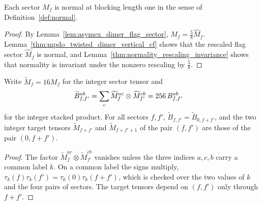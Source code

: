 \begin{lemma}
    \label{thm:asymex_dimer_normal}
    \leanok
    Each sector $M_f$ is normal at blocking length one in the sense of
    Definition~\ref{def:normal}.
\end{lemma}
\begin{proof}
    \leanok
    By Lemma~\ref{lem:asymex_dimer_flag_sector}, $M_f=\frac58\widehat M_f$.
    Lemma~\ref{thm:mpdo_twisted_dimer_vertical_cf} shows that the rescaled
    flag sector $\widehat M_f$ is normal, and
    Lemma~\ref{thm:normality_rescaling_invariance} shows that normality is
    invariant under the nonzero rescaling by $\frac58$.
\end{proof}

\begin{lemma}
    \label{lem:asymex_dimer_sign_rule}
    \leanok
    Write $\widetilde M_f=16M_f$ for the integer sector tensor and
    \begin{align}
        \widetilde B_{f,f'}^{ab}
         & =\sum_c\widetilde M_f^{ac}\otimes\widetilde M_{f'}^{cb}
        =256\,B_{f,f'}^{ab}
        \notag
    \end{align}
    for the integer stacked product. For all sectors $f,f'$,
    $\widetilde B_{f,f'}=\widetilde B_{0,f+f'}$, and the two integer target
    tensors $\widetilde M_{f+f'}$ and $\widetilde M_{f+f'+1}$ of the pair
    $(f,f')$ are those of the pair $(0,f+f')$.
\end{lemma}
\begin{proof}
    \leanok
    The factor $\widetilde M_f^{ac}\otimes\widetilde M_{f'}^{cb}$ vanishes
    unless the three indices $a,c,b$ carry a common label $k$. On a common
    label
    the signs multiply, $\tau_k(f)\tau_k(f')=\tau_k(0)\tau_k(f+f')$, which is
    checked over the two values of $k$ and the four pairs of sectors. The
    target tensors depend on $(f,f')$ only through $f+f'$.
\end{proof}

